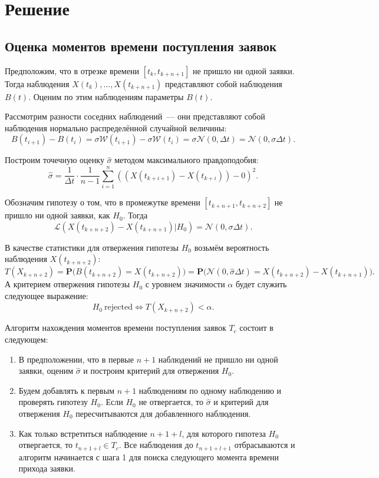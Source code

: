 \documentclass[a4paper,10pt]{article}
\begin{document}
\cite{ivchmed2010matstat}

\section{Решение}
\subsection{Оценка моментов времени поступления заявок}
Предположим, что в отрезке времени $[t_k, t_{k+n+1}]$ не пришло ни одной заявки.
Тогда наблюдения $X(t_k),\ldots,X(t_{k+n+1})$ представляют собой наблюдения
$B(t)$.
Оценим по этим наблюдениям параметры $B(t)$.

Рассмотрим разности соседних наблюдений~--- они представляют собой наблюдения 
нормально распределённой случайной величины:
$$B(t_{i+1}) - B(t_i) = 
    \sigma \mathcal{W}(t_{i+1}) - \sigma \mathcal{W}(t_i) = 
    \sigma \mathcal{N}(0, \Delta t) = 
    \mathcal{N}(0, \sigma \Delta t).$$

Построим точечную оценку $\hat{\sigma}$ методом максимального правдоподобия:
$$\hat{\sigma} = 
    \frac{1}{\Delta t}\cdot\frac{1}{n-1}
        \sum\limits_{i=1}^n ((X(t_{k+i+1}) - X(t_{k+i})) - 0)^2.$$

Обозначим гипотезу о том, что в промежутке времени 
$[t_{k+n+1}, t_{k+n+2}]$ не пришло ни одной заявки, 
как $H_0$.
Тогда 
$$\mathcal{L}(X(t_{k+n+2})-X(t_{k+n+1}) | H_0) = 
    \mathcal{N}(0, \sigma \Delta t).$$

В качестве статистики для отвержения гипотезы $H_0$ возьмём вероятность 
наблюдения $X(t_{k+n+2})$:
$$T(X_{k+n+2}) = 
    \mathbf{P}\big(B(t_{k+n+2})= X(t_{k+n+2})\big) = 
    \mathbf{P}\big(
      \mathcal{N}(0, \hat{\sigma} \Delta t) = X(t_{k+n+2})-X(t_{k+n+1})\big).$$
А критерием отвержения гипотезы $H_0$ с уровнем значимости $\alpha$ 
будет служить следующее выражение:
$$H_0 \  \mathrm{rejected} \Longleftrightarrow T(X_{k+n+2}) < \alpha.$$

Алгоритм нахождения моментов времени поступления заявок $T_c$ 
состоит в следующем:
\begin{enumerate}
  \item В предположении, что в первые $n+1$ наблюдений не пришло ни одной 
  заявки, оценим $\hat{\sigma}$ и построим критерий для отвержения $H_0$.
  \item Будем добавлять к первым $n+1$ наблюдениям по одному наблюдению и 
  проверять гипотезу $H_0$.
  Если $H_0$ не отвергается, то $\hat{\sigma}$ и критерий для отвержения $H_0$ 
  пересчитываются для добавленного наблюдения.
  \item Как только встретиться наблюдение $n+1+l$, для которого гипотеза $H_0$
  отвергается, то \mbox{$t_{n+1+l} \in T_c$}. 
  Все наблюдения до $t_{n+1+l+1}$ отбрасываются и алгоритм начинается с шага 1
  для поиска следующего момента времени прихода заявки.
\end{enumerate}
\end{document}
